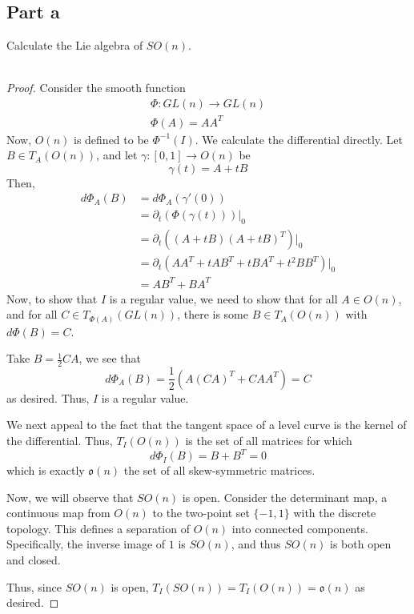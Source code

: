 \documentclass[fontsize=11pt]{scrartcl} %
\numberwithin{equation}{section} %
\numberwithin{figure}{section} %
\numberwithin{table}{section} %
\begin{document}
\subsection*{Part a}
Calculate the Lie algebra of $SO(n)$.
\\
\\
\begin{proof}
    Consider the smooth function
    \[
        \begin{aligned}
            \Phi:GL(n)\to GL(n)\\
            \Phi(A) = AA^T
        \end{aligned}
    \]
    Now, $O(n)$ is defined to be $\Phi^{-1}(I)$. We calculate the differential
    directly. Let $B\in T_A(O(n))$, and let $\gamma:[0,1]\to O(n)$ be
    \[
        \gamma(t) = A+tB
    \]
    Then,
    \[
        \begin{aligned}
            d\Phi_A(B) &= d\Phi_A(\gamma'(0))\\
            &=\partial_t(\Phi(\gamma(t)))|_0\\
            &=\partial_t((A+tB)(A+tB)^T)|_0\\
            &=\partial_t(AA^T + tAB^T + tBA^T + t^2BB^T)|_0\\
            &=AB^T + BA^T
    \end{aligned}
    \]
    Now, to show that $I$ is a regular value, we need to show that for all $A\in
    O(n)$, and for all $C\in T_{\Phi(A)}(GL(n))$, there is some $B\in T_A(O(n))$
    with $d\Phi(B)=C$.

    Take $B=\frac{1}{2}CA$, we see that
    \[
        d\Phi_A(B) = \frac{1}{2}(A(CA)^T + CAA^T) = C
    \]
    as desired. Thus, $I$ is a regular value.

    We next appeal to the fact that the tangent space of a level curve is the
    kernel of the differential. Thus, $T_I(O(n))$ is the set of all matrices for
    which
    \[
        d\Phi_I(B) = B+B^T = 0
    \]
    which is exactly $\mathfrak{o}(n)$ the set of all skew-symmetric matrices.

    Now, we will observe that $SO(n)$ is open. Consider the determinant map, a
    continuous map from $O(n)$ to the two-point set $\{-1,1\}$ with the discrete
    topology. This defines a separation of $O(n)$ into connected components.
    Specifically, the inverse image of $1$ is $SO(n)$, and thus $SO(n)$ is both
    open and closed.

    Thus, since $SO(n)$ is open, $T_I(SO(n)) = T_I(O(n)) = \mathfrak{o}(n)$ as
    desired.
\end{proof}
\end{document}
